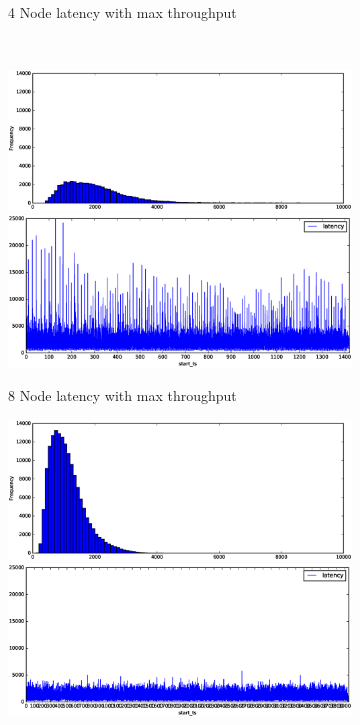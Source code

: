 \begin{figure}
\begin{subfigure}[b]{0.3\textwidth}
        \caption{4 Node latency with max throughput }
    \end{subfigure}
    ~ 
    \begin{subfigure}[b]{0.3\textwidth}
        \includegraphics[width=\textwidth]{eps/storm_agg_8node_th_max_hist}
         \includegraphics[width=\textwidth]{eps/storm_agg_8node_th_max_ts}

        \caption{8 Node latency with max throughput }
    \end{subfigure}




    \begin{subfigure}[b]{0.3\textwidth}
        \includegraphics[width=\textwidth]{eps/storm_agg_2node_th_90_hist}
         \includegraphics[width=\textwidth]{eps/storm_agg_2node_th_90_ts}


\end{subfigure}
\end{figure}
